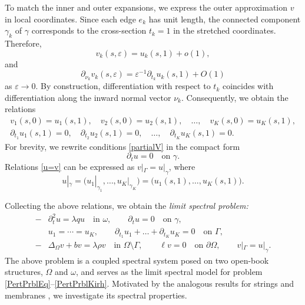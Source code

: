 \documentclass[reqno]{amsart}
\theoremstyle{definition}
\theoremstyle{remark}
\numberwithin{equation}{section}
\newcommand{\eps}{\varepsilon}
\begin{document}
To match the inner and outer expansions, we express the outer approximation $v$ in local coordinates. Since each edge
$e_k$ has unit length, the connected component $\gamma_k$ of $\gamma$ corresponds to the cross-section $t_k=1$ in the stretched coordinates. Therefore,
\begin{equation*}
v_k(s,\eps)=u_k(s,1)+o(1),
\end{equation*}
and
\begin{equation*}
\partial_{\nu_k}v_k(s,\eps)=\eps^{-1}\partial_{t_k} u_k(s,1)+O(1)
\end{equation*}
as $\eps\to0$. 
By construction, differentiation with respect to $t_k$ coincides with differentiation along the inward normal vector $\nu_k$. Consequently, we obtain the relations
\begin{gather}\label{u=v}
v_1(s,0)=u_1(s,1),\quad v_2(s,0)=u_2(s,1),\quad \dots,\quad v_K(s,0)=u_K(s,1),
\\
\partial_{t_1}u_1(s,1)=0,\quad \partial_{t_2}u_2(s,1)=0,\quad \dots,\quad \partial_{t_K}u_K(s,1)=0.
\label{partialV}
\end{gather}
For brevity, we rewrite conditions \eqref{partialV} in the compact form
\begin{equation*}
\partial_t u=0
\quad\text{on }\gamma.
\end{equation*}
Relations \eqref{u=v} can be expressed as $v|_\Gamma=u|_{\gamma}$, where
\begin{equation*}
u|_\gamma=\bigl(u_1|_{\gamma_1},\dots,u_K|_{\gamma_K}\bigr)=\bigl(u_1(s,1),\dots,u_K(s,1)\bigr).
\end{equation*}

Collecting the above relations, we obtain the \textit{limit spectral problem:}
\begin{align}\label{LimitEqV}
-&\partial_t^2u=\lambda qu \quad\text{in }\omega, \qquad \partial_t u=0\quad\text{on }\gamma,
\\\label{KirchV}
& u_1=\cdots=u_K, \qquad \partial_{t_1}u_1+\dots+\partial_{t_K}u_K=0 \quad\text{on }\Gamma,
\\\label{LimitEqU}
-&\Delta_\Omega v+bv=\lambda\rho v \quad\text{in }\Omega\setminus\Gamma,
\qquad \ell v=0 \quad\text{on }\partial\Omega, \qquad v|_\Gamma=u|_\gamma.
\end{align}
The above problem is a coupled spectral system posed on two open-book
structures, $\Omega$ and $\omega$, and serves as the limit spectral model for
problem \eqref{PertPrblEq}--\eqref{PertPrblKirh}. Motivated by the analogous
results for strings \cite{Golovaty2020M2} and membranes
\cite{Golovaty2022AS}, we investigate its spectral properties.
\end{document}

